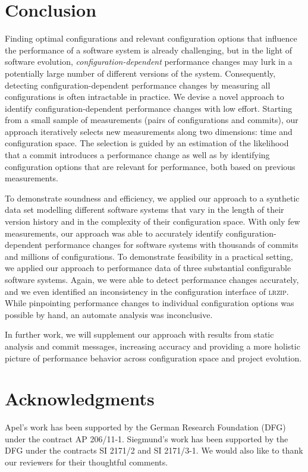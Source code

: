 \documentclass[sigconf, screen]{acmart}
\begin{document}
	\section{Conclusion}
	Finding optimal configurations and relevant configuration options that influence the performance of a software system is already challenging, but in the light of software evolution, \emph{configuration-dependent} performance changes may lurk in a potentially large number of different versions of the system.
	Consequently, detecting configuration-dependent performance changes by measuring all configurations is often intractable in practice. We devise a novel approach to identify config\-uration-dependent performance changes with low effort. Starting from a small sample of measurements (pairs of configurations and commits), our approach iteratively selects new measurements along two dimensions: time and
	configuration space. The selection is guided by an
	estimation of the likelihood that a commit introduces a performance change as well as by identifying configuration options that are relevant for performance, both based on previous measurements.
	
	To demonstrate soundness and efficiency, we applied our approach to a synthetic data set modelling different software systems that vary in the length of their version history and in the complexity of  their configuration space. With only few measurements, our approach was able to accurately
	identify configuration-dependent performance changes for software
	systems with thousands of commits and millions of configurations. 
	To demonstrate feasibility in a practical setting, we
	applied our approach to performance data of three substantial configurable
	software systems. Again, we were able to detect performance
	changes accurately, and we even identified an inconsistency in the configuration
	interface of \textsc{lrzip}. While pinpointing performance changes to individual configuration options was possible by hand, an automate analysis was inconclusive. 
	
	In further work, we will supplement our approach with results from static analysis and commit messages, increasing accuracy and providing a more holistic picture of performance behavior across configuration space and project evolution.
	
	\section{Acknowledgments}
	Apel’s work has been supported by the German Research Foundation (DFG) under the contract AP 206/11-1. Siegmund’s work has been supported by the DFG under the contracts SI 2171/2 and SI 2171/3-1.  We  would  also  like  to  thank  our reviewers for their thoughtful comments. 
	
	\clearpage
	
	
	
	\clearpage
	
	
\end{document}
